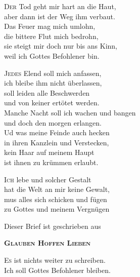 \documentclass[
  paper=a3
  fontsize=16pt,
  parskip=half,
]{scrartcl}
\newcommand{\initial}[3][initialcolor]{%
  \lettrine[
    lhang=0.5,
    lines=2,
    findent=1pt,
    lraise=0.6,
    depth=-1
  ]{\color{#1}\initials#2}{#3}
}
\newcommand{\poemwitdh}{\widthof{seinem Rauchfleisch und Mehl nicht schaden}}
\newcommand{\glaubenhoffenlieben}{
  \vspace{0.5em}
  \centerline{\Large Dieser Brief ist geschrieben aus} \medskip
  \centerline{\Large \serif \textbf{\textsc{Glauben Hoffen Lieben}}}%
}
\begin{document}
\centering
\begin{minipage}{\poemwitdh}
\initial{D}{er} Tod geht mir hart an die Haut, \\
aber dann ist der Weg ihm verbaut. \\
Das Feuer mag mich umlohn, \\
die bittere Flut mich bedrohn, \\
sie steigt mir doch nur bis ans Kinn, \\
weil ich Gottes Befohlener bin. \\
\end{minipage}

\centering
\begin{minipage}{\poemwitdh}
\initial{J}{edes} Elend soll mich anfassen, \\
ich bleibe ihm nicht überlassen, \\
soll leiden alle Beschwerden \\
und von keiner ertötet werden. \\
Manche Nacht  soll ich wachen und bangen \\
und doch den morgen erlangen. \\
Ud was meine Feinde auch hecken  \\
in ihren Kanzlein und Verstecken, \\
kein Haar auf meinem Haupt \\
ist ihnen zu krümmen erlaubt.
\end{minipage}

\centering
\begin{minipage}{\poemwitdh}
\initial{I}{ch} lebe und solcher Gestalt \\
hat die Welt an mir keine Gewalt, \\
mus alles sich schicken und fügen \\
zu Gottes und meinem Vergnügen \\
\end{minipage}

\glaubenhoffenlieben

\centering
\begin{minipage}{\poemwitdh}
\initial{E}{s} ist nichts weiter zu schreiben. \\
Ich soll Gottes Befohlener bleiben.
\end{minipage}
\end{document}
